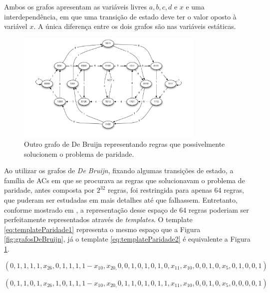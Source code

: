 \documentclass[12pt,a4paper]{article}
\begin{document}
Ambos os grafos apresentam as variáveis livres $a, b, c, d \text{ e } x$ e uma interdependência, em que uma transição de estado deve ter o valor oposto à variável $x$. A única diferença entre os dois grafos são nas variáveis estáticas.

\begin{figure}[h!]
  \centering
  \includegraphics[width=0.8\textwidth]{grafo2.pdf}
    \caption{Outro grafo de De Bruijn representando regras que possivelmente solucionem o problema de paridade.}
    \label{fig:grafosDeBruijn2}
\end{figure}

Ao utilizar os grafos de \textit{De Bruijn}, fixando algumas transições de estado, a família de ACs em que se procurava as regras que solucionavam o problema de paridade, antes composta por $2^{32}$ regras, foi restringida para apenas 64 regras, que puderam ser estudadas em mais detalhes até que falhassem. Entretanto, conforme mostrado em \cite{Verardo2014}, a representação desse espaço de 64 regras poderiam ser perfeitamente representados através de \textit{templates}. O template \ref{eq:templateParidade1} representa o mesmo espaço que a Figura \ref{fig:grafosDeBruijn}, já o template \ref{eq:templateParidade2} é equivalente a Figura \ref{fig:grafosDeBruijn2}.

\begin{equation}
\left(0,1,1,1,1,x_{26},0,1,1,1,1-x_{10},x_{20,}0,0,1,0,1,0,1,0,x_{11},x_{10},0,0,1,0,x_5,0,1,0,0,1\right)
\label{eq:templateParidade1}
\end{equation}

\begin{equation}
\left(0,1,1,0,1,x_{26},1,0,1,1,1-x_{10},x_{20,}0,1,1,0,1,0,1,1,x_{11},x_{10},0,0,1,0,x_5,0,0,0,0,1\right)
\label{eq:templateParidade2}
\end{equation}
\end{document}
